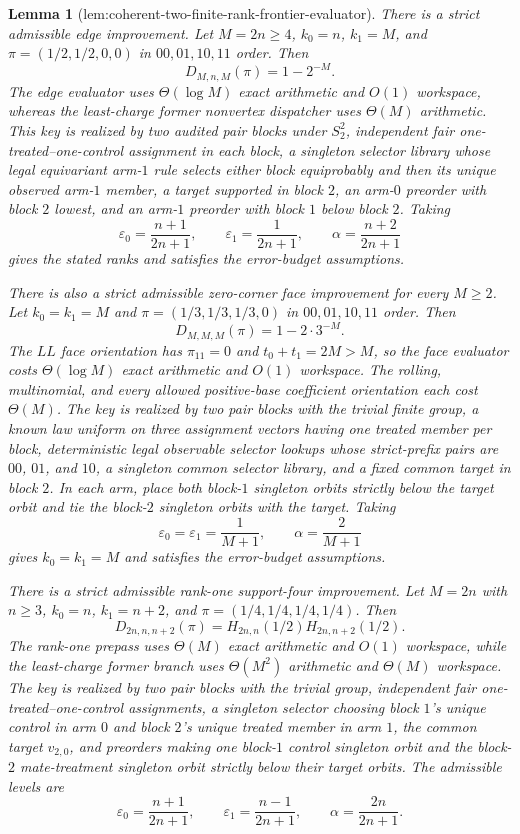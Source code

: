 \documentclass{article}
\newtheorem{lemma}{Lemma}
\begin{document}
\begin{lemma}[lem:coherent-two-finite-rank-frontier-evaluator]
There is a strict admissible edge improvement. Let \(M=2n\ge4\), \(k_0=n\), \(k_1=M\), and \(\pi=(1/2,1/2,0,0)\) in \(00,01,10,11\) order. Then
\[
D_{M,n,M}(\pi)=1-2^{-M}.
\]
The edge evaluator uses \(\Theta(\log M)\) exact arithmetic and \(O(1)\) workspace, whereas the least-charge former nonvertex dispatcher uses \(\Theta(M)\) arithmetic. This key is realized by two audited pair blocks under \(S_2^2\), independent fair one-treated--one-control assignment in each block, a singleton selector library whose legal equivariant arm-\(1\) rule selects either block equiprobably and then its unique observed arm-\(1\) member, a target supported in block \(2\), an arm-\(0\) preorder with block \(2\) lowest, and an arm-\(1\) preorder with block \(1\) below block \(2\). Taking
\[
\varepsilon_0=\frac{n+1}{2n+1},\qquad
\varepsilon_1=\frac1{2n+1},\qquad
\alpha=\frac{n+2}{2n+1}
\]
gives the stated ranks and satisfies the error-budget assumptions.

There is also a strict admissible zero-corner face improvement for every \(M\ge2\). Let \(k_0=k_1=M\) and \(\pi=(1/3,1/3,1/3,0)\) in \(00,01,10,11\) order. Then
\[
D_{M,M,M}(\pi)=1-2\cdot3^{-M}.
\]
The \(LL\) face orientation has \(\pi_{11}=0\) and \(t_0+t_1=2M>M\), so the face evaluator costs \(\Theta(\log M)\) exact arithmetic and \(O(1)\) workspace. The rolling, multinomial, and every allowed positive-base coefficient orientation each cost \(\Theta(M)\). The key is realized by two pair blocks with the trivial finite group, a known law uniform on three assignment vectors having one treated member per block, deterministic legal observable selector lookups whose strict-prefix pairs are \(00\), \(01\), and \(10\), a singleton common selector library, and a fixed common target in block \(2\). In each arm, place both block-\(1\) singleton orbits strictly below the target orbit and tie the block-\(2\) singleton orbits with the target. Taking
\[
\varepsilon_0=\varepsilon_1=\frac1{M+1},
\qquad
\alpha=\frac2{M+1}
\]
gives \(k_0=k_1=M\) and satisfies the error-budget assumptions.

There is a strict admissible rank-one support-four improvement. Let \(M=2n\) with \(n\ge3\), \(k_0=n\), \(k_1=n+2\), and \(\pi=(1/4,1/4,1/4,1/4)\). Then
\[
D_{2n,n,n+2}(\pi)=H_{2n,n}(1/2)H_{2n,n+2}(1/2).
\]
The rank-one prepass uses \(\Theta(M)\) exact arithmetic and \(O(1)\) workspace, while the least-charge former branch uses \(\Theta(M^2)\) arithmetic and \(\Theta(M)\) workspace. The key is realized by two pair blocks with the trivial group, independent fair one-treated--one-control assignments, a singleton selector choosing block \(1\)'s unique control in arm \(0\) and block \(2\)'s unique treated member in arm \(1\), the common target \(v_{2,0}\), and preorders making one block-\(1\) control singleton orbit and the block-\(2\) mate-treatment singleton orbit strictly below their target orbits. The admissible levels are
\[
\varepsilon_0=\frac{n+1}{2n+1},\qquad
\varepsilon_1=\frac{n-1}{2n+1},\qquad
\alpha=\frac{2n}{2n+1}.
\]
\end{lemma}
\end{document}
